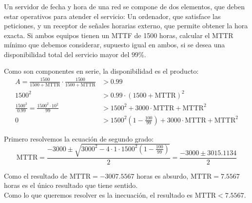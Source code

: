 \begin{problem}[5]
Un servidor de fecha y hora de una red se compone de dos elementos, que deben estar operativos para atender el servicio: Un ordenador, que satisface las peticiones, y un receptor
de señales horarias externo, que permite obtener la hora exacta. Si ambos equipos tienen un MTTF de 1500 horas, calcular el MTTR mínimo que debemos considerar, supuesto igual en ambos, si se desea una disponibilidad total del servicio mayor del $99\%$.

\solution

Como son componentes en serie, la disponibilidad es el producto:
\begin{align*}
A = \frac{1500}{1500+\text{MTTR}} \cdot \frac{1500}{1500+\text{MTTR}} &> 0.99\\[0.2em]
1500^2 &> 0.99 \cdot (1500+\text{MTTR})^2 \\[0.2em]
\frac{1500^2}{0.99} = \frac{1500^2 \cdot 10^2}{99} &> 1500^2 + 3000 \cdot \text{MTTR} + \text{MTTR}^2 \\
0 &> 1500^2\left(1 -\frac{100}{99}\right) + 3000 \cdot \text{MTTR} + \text{MTTR}^2
\end{align*}

Primero resolvemos la ecuación de segundo grado:
\[ \text{MTTR} = \frac{-3000 \pm \sqrt{3000^2 - 4 \cdot 1 \cdot 1500^2(1 -\frac{100}{99})}}{2} = \frac{-3000 \pm 3015.1134}{2} \]

Como el resultado de $\text{MTTR}=-3007.5567$ horas es absurdo, $\text{MTTR}=7.5567$ horas es el único resultado que tiene sentido.\\

Como lo que queremos resolver es la inecuación, el resultado es $\text{MTTR} < 7.5567$.
\end{problem}

